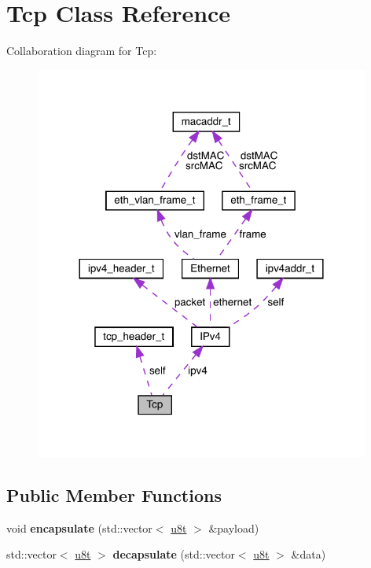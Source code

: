 \hypertarget{classTcp}{}\section{Tcp Class Reference}
\label{classTcp}


Collaboration diagram for Tcp\+:\nopagebreak
\begin{figure}[H]
\begin{center}
\leavevmode
\includegraphics[width=312pt]{classTcp__coll__graph}
\end{center}
\end{figure}
\subsection*{Public Member Functions}
\begin{DoxyCompactItemize}
\item 
\mbox{\label{classTcp_aff0ea81b11c297e17b8791a0c03a8589}} 
void {\bfseries encapsulate} (std\+::vector$<$ \hyperlink{macros_8h_a176a4ab0531a048e0693a4520c550193}{u8t} $>$ \&payload)
\item 
\mbox{\label{classTcp_ac11613828a7a445052a338e521706ffe}} 
std\+::vector$<$ \hyperlink{macros_8h_a176a4ab0531a048e0693a4520c550193}{u8t} $>$ {\bfseries decapsulate} (std\+::vector$<$ \hyperlink{macros_8h_a176a4ab0531a048e0693a4520c550193}{u8t} $>$ \&data)
\end{DoxyCompactItemize}
